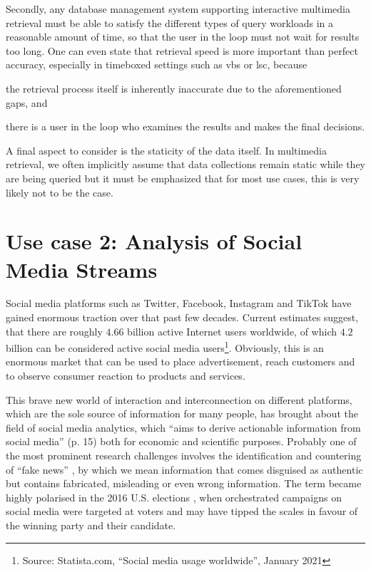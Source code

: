 Secondly, any database management system supporting interactive multimedia retrieval must be able to satisfy the different types of query workloads in a reasonable amount of time, so that the user in the loop must not wait for results too long. One can even state that retrieval speed is more important than perfect accuracy, especially in timeboxed settings such as \acrshort{vbs} or \acrshort{lsc}, because
\begin{enumerate*}[label=(\roman*)]
    \item the retrieval process itself is inherently inaccurate due to the aforementioned gaps, and
    \item there is a user in the loop who examines the results and makes the final decisions.
\end{enumerate*}

A final aspect to consider is the staticity of the data itself. In multimedia retrieval, we often implicitly assume that data collections remain static while they are being queried but it must be emphasized that for most use cases, this is very likely not to be the case. 

\section{Use case 2: Analysis of Social Media Streams}
\label{section:application_online_analysis}

Social media platforms such as Twitter, Facebook, Instagram and TikTok have gained enormous traction over that past few decades. Current estimates suggest, that there are roughly $4.66$ billion active Internet users worldwide, of which $4.2$ billion can be considered active social media users\footnote{Source: Statista.com, ``Social media usage worldwide'', January 2021}. Obviously, this is an enormous market that can be used to place advertisement, reach customers and to observe consumer reaction to products and services.

This brave new world of interaction and interconnection on different platforms, which are the sole source of information for many people, has brought about the field of social media analytics, which ``aims to derive actionable information from social media'' \cite{Zheng:2010Social} (p. 15) both for economic and scientific purposes. Probably one of the most prominent research challenges involves the identification and countering of ``fake news'' \cite{Lazer:2018Science}, by which we mean information that comes disguised as authentic but contains fabricated, misleading or even wrong information. The term became highly polarised in the 2016 U.S. elections \cite{Quandt:2019Fake}, when orchestrated campaigns on social media were targeted at voters and may have tipped the scales in favour of the winning party and their candidate.

